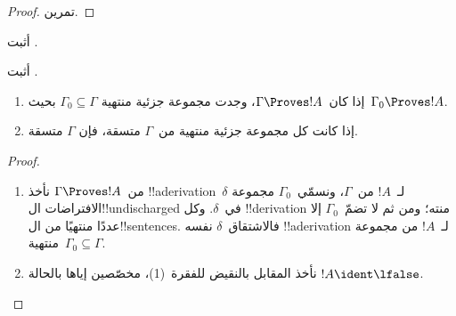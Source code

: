 \documentclass[../../../include/open-logic-section]{subfiles}
\begin{document}
\begin{proof}
تمرين.
\end{proof}

\begin{prob}
أثبت .
\end{prob}
\tagendprob

\begin{prob}
أثبت .
\end{prob}
\tagendprob

\begin{prop}[التراص]
  \begin{enumerate}
  \item إذا كان~$\Gamma \Proves !A$، وجدت مجموعة جزئية منتهية
    $\Gamma_0 \subseteq \Gamma$ بحيث~$\Gamma_0 \Proves !A$.
  \item إذا كانت كل مجموعة جزئية منتهية من~$\Gamma$ متسقة، فإن
    $\Gamma$ متسقة.
  \end{enumerate}
\end{prop}

\begin{proof}
  \begin{enumerate}
    \item من~$\Gamma \Proves !A$ نأخذ !!a{derivation}~$\delta$
      لـ~$!A$ من~$\Gamma$، ونسمّي~$\Gamma_0$ مجموعة الافتراضات
      ال!!{undischarged} في~$\delta$. وكل !!{derivation} منته؛ ومن ثم
      لا تضمّ~$\Gamma_0$ إلا عددًا منتهيًا من ال!!{sentence}s.
      فالاشتقاق~$\delta$ نفسه !!a{derivation} لـ~$!A$ من مجموعة
      منتهية~$\Gamma_0 \subseteq \Gamma$.
    \item نأخذ المقابل بالنقيض للفقرة~(1)، مخصّصين إياها بالحالة
      $!A \ident \lfalse$.
  \end{enumerate}
\end{proof}
\end{document}
